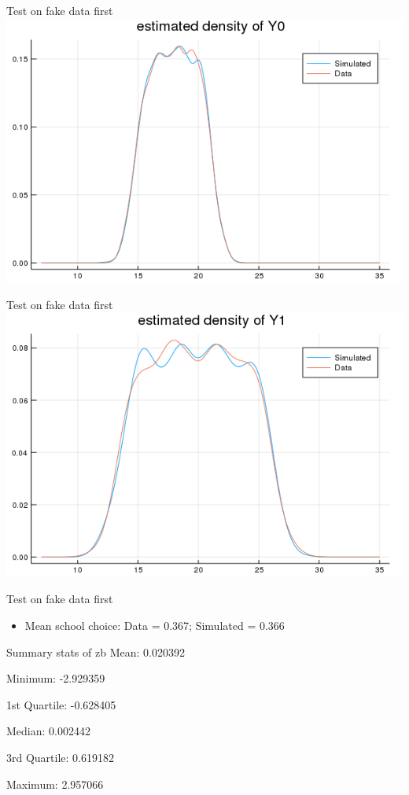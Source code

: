 \documentclass{beamer}
\begin{document}
\begin{frame}{Test on fake data first}
\centering
\includegraphics[scale=0.5]{y0_fake.png}
\end{frame}
\begin{frame}{Test on fake data first}
\centering
\includegraphics[scale=0.5]{y1_fake.png}
\end{frame}

\begin{frame}{Test on fake data first}
\begin{itemize}
\item Mean school choice: Data = 0.367; Simulated = 0.366
\end{itemize}
\end{frame}

\begin{frame}{Summary stats of zb}
\centering
Mean:           0.020392

Minimum:        -2.929359

1st Quartile:   -0.628405

Median:         0.002442

3rd Quartile:   0.619182

Maximum:        2.957066
\end{frame}
\end{document}

